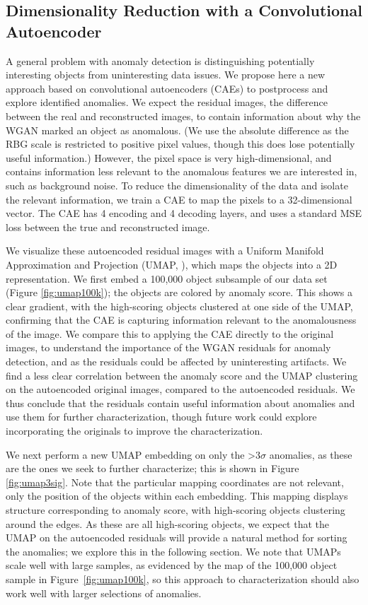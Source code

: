 \documentclass{article}
\begin{document}
\subsection{Dimensionality Reduction with a Convolutional Autoencoder}

A general problem with anomaly detection is distinguishing potentially interesting objects from uninteresting data issues.  
We propose here a new approach based on convolutional autoencoders (CAEs) to postprocess and explore identified anomalies. 
We expect the residual images, the difference between the real and reconstructed images, to contain information about why the WGAN marked an object as anomalous.
(We use the absolute difference as the RBG scale is restricted to positive pixel values, though this does lose potentially useful information.)
However, the pixel space is very high-dimensional, and contains information less relevant to the anomalous features we are interested in, such as background noise.
To reduce the dimensionality of the data and isolate the relevant information, we train a CAE to map the pixels to a 32-dimensional vector.
The CAE has 4 encoding and 4 decoding layers, and uses a standard MSE loss between the true and reconstructed image.

We visualize these autoencoded residual images with a Uniform Manifold Approximation and Projection (UMAP, \citealt{McInnes2018}), which maps the objects into a 2D representation.
We first embed a 100,000 object subsample of our data set (Figure \ref{fig:umap100k}); the objects are colored by anomaly score.
This shows a clear gradient, with the high-scoring objects clustered at one side of the UMAP, confirming that the CAE is capturing information relevant to the anomalousness of the image.
We compare this to applying the CAE directly to the original images, to understand the importance of the WGAN residuals for anomaly detection, and as the residuals could be affected by uninteresting artifacts.
We find a less clear correlation between the anomaly score and the UMAP clustering on the autoencoded original images, compared to the autoencoded residuals.
We thus conclude that the residuals contain useful information about anomalies and use them for further characterization, though future work could explore incorporating the originals to improve the characterization.

We next perform a new UMAP embedding on only the >3$\sigma$ anomalies, as these are the ones we seek to further characterize; this is shown in Figure \ref{fig:umap3sig}.
Note that the particular mapping coordinates are not relevant, only the position of the objects within each embedding.
This mapping displays structure corresponding to anomaly score, with high-scoring objects clustering around the edges.
As these are all high-scoring objects, we expect that the UMAP on the autoencoded residuals will provide a natural method for sorting the anomalies; we explore this in the following section.
We note that UMAPs scale well with large samples, as evidenced by the map of the 100,000 object sample in Figure~\ref{fig:umap100k}, so this approach to characterization should also work well with larger selections of anomalies.
\end{document}
